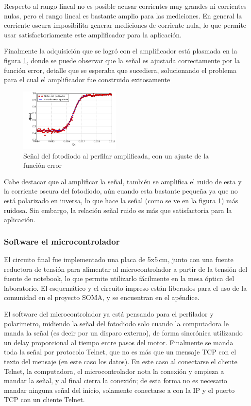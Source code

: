 Respecto al rango lineal no es posible acusar corrientes muy grandes ni corrientes nulas, pero el rango lineal es bastante amplio para las mediciones. En general la corriente oscura imposibilita generar mediciones de corriente nula, lo que permite usar satisfactoriamente este amplificador para la aplicación.

Finalmente la adquisición que se logró con el amplificador está plasmada en la figura \ref{fig:circuito/amp/perfilacion_ajuste}, donde se puede observar que la señal es ajustada correctamente por la función error, detalle que se esperaba que sucediera, solucionando el problema para el cual el amplificador fue construido exitosamente

\begin{figure}[H]
    \centering
    \includegraphics[width=0.45\textwidth]{fig/perfilador/fit_data_plastico_subida}
    \caption{Señal del fotodiodo al perfilar amplificada, con un ajuste de la función error}
    \label{fig:circuito/amp/perfilacion_ajuste}
\end{figure}
Cabe destacar que al amplificar la señal, también se amplifica el ruido de esta y la corriente oscura del fotodiodo, aún cuando esta bastante pequeña ya que no está polarizado en inversa, lo que hace la señal (como se ve en la figura \ref{fig:circuito/amp/perfilacion_ajuste}) más ruidosa. Sin embargo, la relación señal ruido es más que satisfactoria para la aplicación.

\subsubsection{Software el microcontrolador}
El circuito final fue implementado una placa de 5x5$\,$cm, junto con una fuente reductora de tensión para alimentar al microcontrolador a partir de la tensión del fuente de notebook, lo que permite utilizarlo fácilmente en la mesa óptica del laboratorio. El esquemático y el circuito impreso están liberados para el uso de la comunidad en el proyecto SOMA, y se encuentran en el apéndice.

El software del microcontrolador ya está pensando para el perfilador y polarimetro, midiendo la señal del fotodiodo solo cuando la computadora le manda la señal (es decir por un disparo externo), de forma sincrónica utilizando un delay proporcional al tiempo entre pasos del motor. Finalmente se manda toda la señal por protocolo Telnet, que no es más que un mensaje TCP con el texto del mensaje (en este caso los datos). En este caso al conectarse el cliente Telnet, la computadora, el microcontrolador nota la conexión y empieza a mandar la señal, y al final cierra la conexión; de esta forma no es necesario mandar ninguna señal del inicio, solamente conectarse a con la IP y el puerto TCP con un cliente Telnet.

